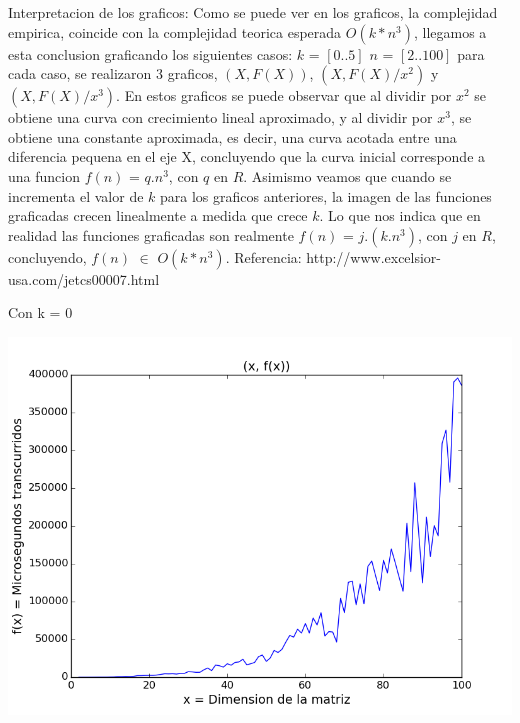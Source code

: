 \vspace{2mm}

Interpretacion de los graficos: Como se puede ver en los graficos, la complejidad empirica, coincide con la complejidad teorica esperada $O(k*n^3)$, llegamos a esta conclusion graficando los siguientes casos: $k$ = $[0..5]$ $n$ = $[2..100]$ para cada caso, se realizaron 3 graficos, $(X,F(X))$,  $(X,F(X)/x^2)$ y $(X,F(X)/x^3)$. En estos graficos se puede observar que al dividir por $x^2$ se obtiene una curva con crecimiento lineal aproximado, y al dividir por $x^3$, se obtiene una constante aproximada, es decir, una curva acotada entre una diferencia pequena en el eje X, concluyendo que la curva inicial corresponde a una funcion $f(n)$ = $q.n^3$, con $q$ en $R$. Asimismo veamos que cuando se incrementa el valor de $k$ para los graficos anteriores, la imagen de las funciones graficadas crecen linealmente a medida que crece $k$. Lo que nos indica que en realidad las funciones graficadas son realmente $f(n)$ = $j.(k.n^3)$, con $j$ en $R$, concluyendo, $f(n)$ $\in$ $O(k*n^3)$. Referencia: http://www.excelsior-usa.com/jetcs00007.html

\vspace{2mm}

Con k = 0

\begin{center}
\includegraphics[scale=0.54]{images/0potenciafuncion}
\end{center}


